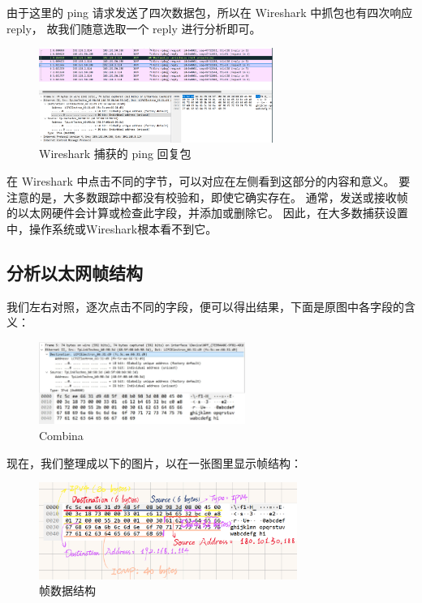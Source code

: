 \documentclass[14pt,a4paper,UTF8,twoside]{article}
\begin{document}
由于这里的 ping 请求发送了四次数据包，所以在 Wireshark 中抓包也有四次响应 reply，
故我们随意选取一个 reply 进行分析即可。

\begin{figure}[H]
  \centering
  \includegraphics[width=0.68\textwidth]{lab2/wiresharkping.png}
  \caption{Wireshark 捕获的 ping 回复包}
  \label{fig:reply}
\end{figure}

在 Wireshark 中点击不同的字节，可以对应在左侧看到这部分的内容和意义。
要注意的是，大多数跟踪中都没有校验和，即使它确实存在。
通常，发送或接收帧的以太网硬件会计算或检查此字段，并添加或删除它。
因此，在大多数捕获设置中，操作系统或Wireshark根本看不到它。

\subsection{分析以太网帧结构}

我们左右对照，逐次点击不同的字段，便可以得出结果，下面是原图中各字段的含义：

\begin{figure} [H]
  \centering
  \includegraphics[width=0.6\textwidth]{lab2/combina.jpg}
  \caption{Combina}
  \label{fig:combina}
\end{figure}

现在，我们整理成以下的图片，以在一张图里显示帧结构：

\begin{figure} [H]
  \centering
  \includegraphics[width=0.75\textwidth]{lab2/structure.png}
  \caption{帧数据结构}
\end{figure}
\end{document}
